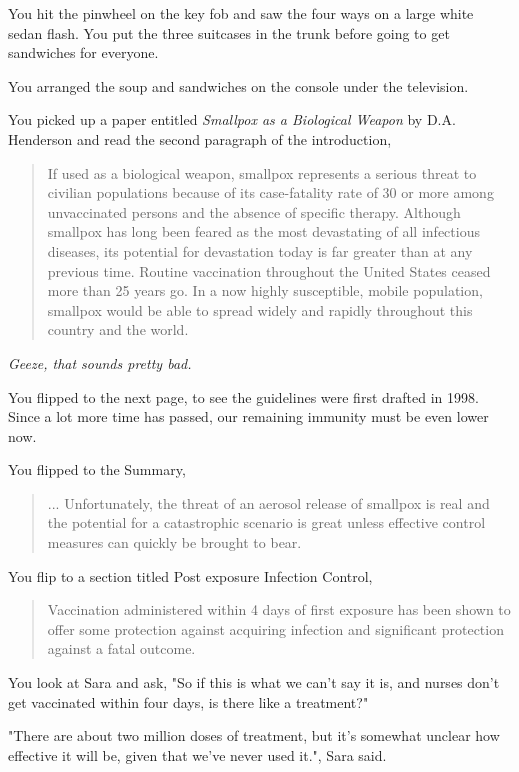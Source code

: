 \documentclass[a5paper, symmetric]{tufte-book}
\newcommand*{\smallpercent}{\textsmaller[2]{\char"25} }
\begin{document}
You hit the pinwheel on the key fob and saw the four ways on a large white sedan flash. You put the three suitcases in the trunk before going to get sandwiches for everyone. 

You arranged the soup and sandwiches on the console under the television.

You picked up a paper entitled \textit{Smallpox as a Biological Weapon} by D.A. Henderson and read the second paragraph of the introduction, 

\begin{quote}
If used as a biological weapon, smallpox represents a serious threat to civilian populations because of its case-fatality rate of 30\smallpercent or more among unvaccinated persons and the absence of specific therapy. Although smallpox has long been feared as the most devastating of all infectious diseases, its potential for devastation today is far greater than at any previous time. Routine vaccination throughout the United States ceased more than 25 years go. In a now highly susceptible, mobile population, smallpox would be able to spread widely and rapidly throughout this country and the world. 
\end{quote}

\textit{Geeze, that sounds pretty bad.}

You flipped to the next page, to see the guidelines were first drafted in 1998. Since a lot more time has passed, our remaining immunity must be even lower now.

You flipped to the Summary,

\begin{quote}
   ... Unfortunately, the threat of an aerosol release of smallpox is real and the potential for a catastrophic scenario is great unless effective control measures can quickly be brought to bear. 
\end{quote}

You flip to a section titled Post exposure Infection Control,

\begin{quote}
   Vaccination administered within 4 days of first exposure has been shown to offer some protection against acquiring infection and significant protection against a fatal outcome. 
\end{quote}

You look at Sara and ask, "So if this is what we can't say it is, and nurses don't get vaccinated within four days, is there like a treatment?"

"There are about two million doses of treatment, but it's somewhat unclear how effective it will be, given that we've never used it.", Sara said. 
\end{document}
